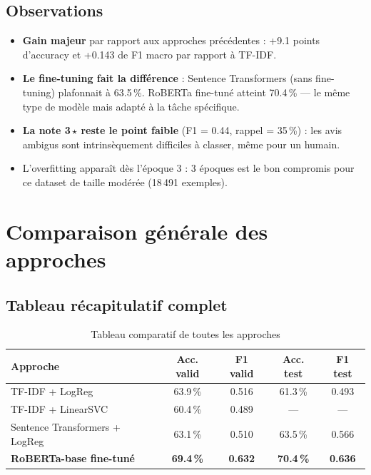 \documentclass[12pt, a4paper]{article}
\begin{document}
\subsection{Observations}

\begin{itemize}
  \item \textbf{Gain majeur} par rapport aux approches précédentes : +9.1 points d'accuracy
        et +0.143 de F1 macro par rapport à TF-IDF.
  \item \textbf{Le fine-tuning fait la différence} : Sentence Transformers (sans fine-tuning)
        plafonnait à 63.5\,\%. RoBERTa fine-tuné atteint 70.4\,\% — le même type de modèle
        mais adapté à la tâche spécifique.
  \item \textbf{La note 3\,$\star$ reste le point faible} (F1 = 0.44, rappel = 35\,\%) :
        les avis ambigus sont intrinsèquement difficiles à classer, même pour un humain.
  \item L'overfitting apparaît dès l'époque 3 : 3 époques est le bon compromis
        pour ce dataset de taille modérée (18\,491 exemples).
\end{itemize}

\section{Comparaison générale des approches}
\label{sec:comparaison}

\subsection{Tableau récapitulatif complet}

\begin{table}[H]
  \centering
  \begin{tabularx}{\textwidth}{Xcccc}
    \toprule
    \textbf{Approche} & \textbf{Acc. valid} & \textbf{F1 valid} & \textbf{Acc. test} & \textbf{F1 test} \\
    \midrule
    TF-IDF + LogReg              & 63.9\,\% & 0.516 & 61.3\,\% & 0.493 \\
    TF-IDF + LinearSVC           & 60.4\,\% & 0.489 & —        & — \\
    Sentence Transformers + LogReg & 63.1\,\% & 0.510 & 63.5\,\% & 0.566 \\
    \textbf{RoBERTa-base fine-tuné} & \textbf{69.4\,\%} & \textbf{0.632} & \textbf{70.4\,\%} & \textbf{0.636} \\
    \bottomrule
  \end{tabularx}
  \caption{Tableau comparatif de toutes les approches}
\end{table}
\end{document}
